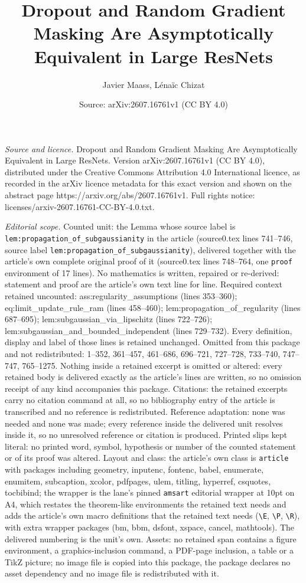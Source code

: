 \documentclass[10pt,a4paper]{amsart}
\title[Dropout and Random Gradient Masking Are Asymptotically Equiv]{Dropout and Random Gradient Masking Are Asymptotically Equivalent in Large ResNets}
\author{Javier Maass, L\'ena\"ic Chizat}
\date{Source: arXiv:2607.16761v1 (CC BY 4.0)}
\begin{document}
\maketitle

\noindent\emph{Source and licence.} Dropout and Random Gradient Masking Are Asymptotically Equivalent in Large ResNets. Version arXiv:2607.16761v1 (CC BY 4.0), distributed under the Creative Commons Attribution 4.0 International licence, as recorded in the arXiv licence metadata for this exact version and shown on the abstract page https://arxiv.org/abs/2607.16761v1. Full rights notice: licenses/arxiv-2607.16761-CC-BY-4.0.txt.\par\smallskip

\noindent\textit{Editorial scope.} Counted unit: the Lemma whose source label is \texttt{lem:propagation\_of\_subgaussianity} in the article (source0.tex lines 741--746, source label \texttt{lem:propagation\_of\_subgaussianity}), delivered together with the article's own complete original proof of it (source0.tex lines 748--764, one \texttt{proof} environment of 17 lines). No mathematics is written, repaired or re-derived: statement and proof are the article's own text line for line. Required context retained uncounted: ass:regularity\_assumptions (lines 353--360); eq:limit\_update\_rule\_ram (lines 458--460); lem:propagation\_of\_regularity (lines 687--695); lem:subgaussian\_via\_lipschitz (lines 722--726); lem:subgaussian\_and\_bounded\_independent (lines 729--732). Every definition, display and label of those lines is retained unchanged. Omitted from this package and not redistributed: 1--352, 361--457, 461--686, 696--721, 727--728, 733--740, 747--747, 765--1275. Nothing inside a retained excerpt is omitted or altered: every retained body is delivered exactly as the article's lines are written, so no omission receipt of any kind accompanies this package. Citations: the retained excerpts carry no citation command at all, so no bibliography entry of the article is transcribed and no reference is redistributed. Reference adaptation: none was needed and none was made; every reference inside the delivered unit resolves inside it, so no unresolved reference or citation is produced. Printed slips kept literal: no printed word, symbol, hypothesis or number of the counted statement or of its proof was altered. Layout and class: the article's own class is \texttt{article} with packages including geometry, inputenc, fontenc, babel, enumerate, enumitem, subcaption, xcolor, pdfpages, ulem, titling, hyperref, csquotes, tocbibind; the wrapper is the lane's pinned \texttt{amsart} editorial wrapper at 10pt on A4, which restates the theorem-like environments the retained text needs and adds the article's own macro definitions that the retained text needs (\texttt{\textbackslash E}, \texttt{\textbackslash P}, \texttt{\textbackslash R}), with extra wrapper packages (bm, bbm, dsfont, xspace, cancel, mathtools). The delivered numbering is the unit's own. Assets: no retained span contains a figure environment, a graphics-inclusion command, a PDF-page inclusion, a table or a TikZ picture; no image file is copied into this package, the package declares no asset dependency and no image file is redistributed with it. 
\end{document}
